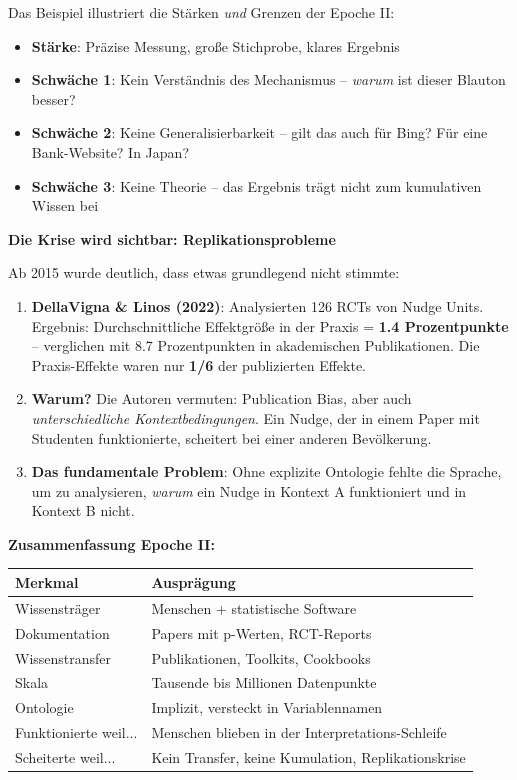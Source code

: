 Das Beispiel illustriert die Stärken \textit{und} Grenzen der Epoche II:
\begin{itemize}
    \item \textbf{Stärke}: Präzise Messung, große Stichprobe, klares Ergebnis
    \item \textbf{Schwäche 1}: Kein Verständnis des Mechanismus -- \textit{warum} ist dieser Blauton besser?
    \item \textbf{Schwäche 2}: Keine Generalisierbarkeit -- gilt das auch für Bing? Für eine Bank-Website? In Japan?
    \item \textbf{Schwäche 3}: Keine Theorie -- das Ergebnis trägt nicht zum kumulativen Wissen bei
\end{itemize}

\textbf{Die Krise wird sichtbar: Replikationsprobleme}

Ab 2015 wurde deutlich, dass etwas grundlegend nicht stimmte:

\begin{enumerate}
    \item \textbf{DellaVigna \& Linos (2022)}: Analysierten 126 RCTs von Nudge Units. Ergebnis: Durchschnittliche Effektgröße in der Praxis = \textbf{1.4 Prozentpunkte} -- verglichen mit 8.7 Prozentpunkten in akademischen Publikationen. Die Praxis-Effekte waren nur \textbf{1/6} der publizierten Effekte.

    \item \textbf{Warum?} Die Autoren vermuten: Publication Bias, aber auch \textit{unterschiedliche Kontextbedingungen}. Ein Nudge, der in einem Paper mit Studenten funktionierte, scheitert bei einer anderen Bevölkerung.

    \item \textbf{Das fundamentale Problem}: Ohne explizite Ontologie fehlte die Sprache, um zu analysieren, \textit{warum} ein Nudge in Kontext A funktioniert und in Kontext B nicht.
\end{enumerate}

\textbf{Zusammenfassung Epoche II:}
\begin{table}[h]
\centering
\begin{tabular}{@{}ll@{}}
\toprule
\textbf{Merkmal} & \textbf{Ausprägung} \\
\midrule
Wissensträger & Menschen + statistische Software \\
Dokumentation & Papers mit p-Werten, RCT-Reports \\
Wissenstransfer & Publikationen, Toolkits, Cookbooks \\
Skala & Tausende bis Millionen Datenpunkte \\
Ontologie & Implizit, versteckt in Variablennamen \\
Funktionierte weil... & Menschen blieben in der Interpretations-Schleife \\
Scheiterte weil... & Kein Transfer, keine Kumulation, Replikationskrise \\
\bottomrule
\end{tabular}
\end{table}

